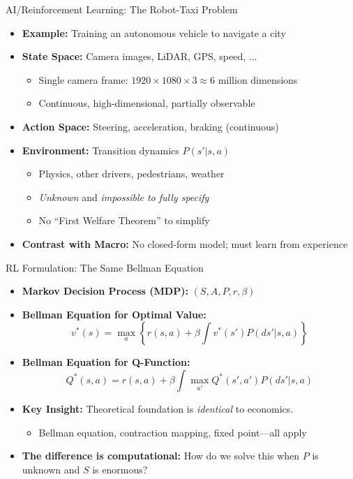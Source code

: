 \begin{frame}{AI/Reinforcement Learning: The Robot-Taxi Problem}
\begin{itemize}
\item \textbf{Example:} Training an autonomous vehicle to navigate a city

\medskip
\item \textbf{State Space:} Camera images, LiDAR, GPS, speed, ...
\begin{itemize}
    \item Single camera frame: $1920 \times 1080 \times 3 \approx 6$ million dimensions
    \item Continuous, high-dimensional, partially observable
\end{itemize}

\medskip
\item \textbf{Action Space:} Steering, acceleration, braking (continuous)

\medskip
\item \textbf{Environment:} Transition dynamics $P(s'|s, a)$
\begin{itemize}
    \item Physics, other drivers, pedestrians, weather
    \item \emph{Unknown} and \emph{impossible to fully specify}
    \item No ``First Welfare Theorem'' to simplify
\end{itemize}

\medskip
\item \textbf{Contrast with Macro:} No closed-form model; must learn from experience
\end{itemize}
\end{frame}

\begin{frame}{RL Formulation: The Same Bellman Equation}
\begin{itemize}
\item \textbf{Markov Decision Process (MDP):} $(S, A, P, r, \beta)$

\medskip
\item \textbf{Bellman Equation for Optimal Value:}
\[
v^*(s) = \max_{a} \left\{ r(s, a) + \beta \int v^*(s') P(ds'|s, a) \right\}
\]

\medskip
\item \textbf{Bellman Equation for Q-Function:}
\[
Q^*(s, a) = r(s, a) + \beta \int \max_{a'} Q^*(s', a') P(ds'|s, a)
\]

\medskip
\item \textbf{Key Insight:} Theoretical foundation is \emph{identical} to economics.
\begin{itemize}
    \item Bellman equation, contraction mapping, fixed point---all apply
\end{itemize}

\medskip
\item \textbf{The difference is computational:} How do we solve this when $P$ is unknown and $S$ is enormous?
\end{itemize}
\end{frame}


